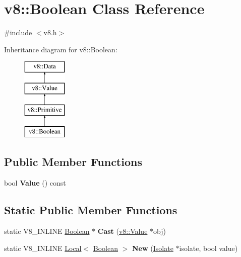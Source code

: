 \hypertarget{classv8_1_1_boolean}{}\section{v8\+:\+:Boolean Class Reference}
\label{classv8_1_1_boolean}


{\ttfamily \#include $<$v8.\+h$>$}

Inheritance diagram for v8\+:\+:Boolean\+:\begin{figure}[H]
\begin{center}
\leavevmode
\includegraphics[height=4.000000cm]{classv8_1_1_boolean}
\end{center}
\end{figure}
\subsection*{Public Member Functions}
\begin{DoxyCompactItemize}
\item 
bool {\bfseries Value} () const \hypertarget{classv8_1_1_boolean_aa493d54eb43afc64ab796e1cf66ff910}{}\label{classv8_1_1_boolean_aa493d54eb43afc64ab796e1cf66ff910}

\end{DoxyCompactItemize}
\subsection*{Static Public Member Functions}
\begin{DoxyCompactItemize}
\item 
static V8\+\_\+\+I\+N\+L\+I\+NE \hyperlink{classv8_1_1_boolean}{Boolean} $\ast$ {\bfseries Cast} (\hyperlink{classv8_1_1_value}{v8\+::\+Value} $\ast$obj)\hypertarget{classv8_1_1_boolean_a92493565c4b9400825a0ff09780d7ff4}{}\label{classv8_1_1_boolean_a92493565c4b9400825a0ff09780d7ff4}

\item 
static V8\+\_\+\+I\+N\+L\+I\+NE \hyperlink{classv8_1_1_local}{Local}$<$ \hyperlink{classv8_1_1_boolean}{Boolean} $>$ {\bfseries New} (\hyperlink{classv8_1_1_isolate}{Isolate} $\ast$isolate, bool value)\hypertarget{classv8_1_1_boolean_aeb32aa1bf1853bc4c5f076ee6a8b9a0f}{}\label{classv8_1_1_boolean_aeb32aa1bf1853bc4c5f076ee6a8b9a0f}

\end{DoxyCompactItemize}

